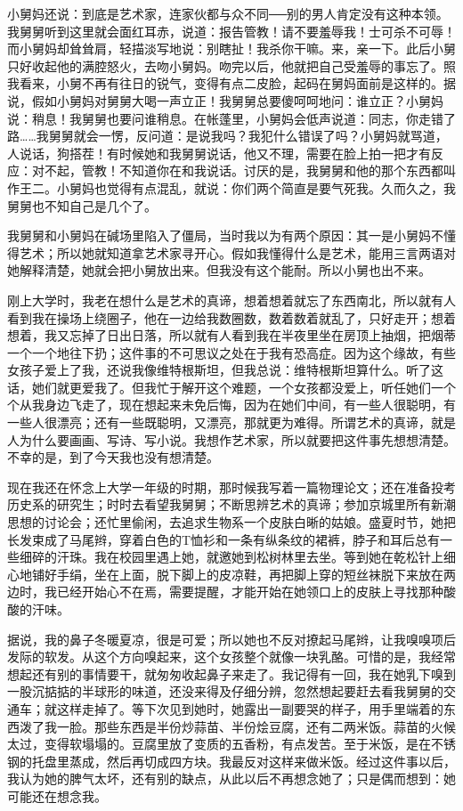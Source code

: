 小舅妈还说：到底是艺术家，连家伙都与众不同──别的男人肯定没有这种本领。我舅舅听到这里就会面红耳赤，说道：报告管教！请不要羞辱我！士可杀不可辱！而小舅妈却耸耸肩，轻描淡写地说：别瞎扯！我杀你干嘛。来，亲一下。此后小舅只好收起他的满腔怒火，去吻小舅妈。吻完以后，他就把自己受羞辱的事忘了。照我看来，小舅不再有往日的锐气，变得有点二皮脸，起码在舅妈面前是这样的。据说，假如小舅妈对舅舅大喝一声立正！我舅舅总要傻呵呵地问：谁立正？小舅妈说：稍息！我舅舅也要问谁稍息。在帐蓬里，小舅妈会低声说道：同志，你走错了路……我舅舅就会一愣，反问道：是说我吗？我犯什么错误了吗？小舅妈就骂道，人说话，狗搭茬！有时候她和我舅舅说话，他又不理，需要在脸上拍一把才有反应：对不起，管教！不知道你在和我说话。讨厌的是，我舅舅和他的那个东西都叫作王二。小舅妈也觉得有点混乱，就说：你们两个简直是要气死我。久而久之，我舅舅也不知自己是几个了。 

我舅舅和小舅妈在碱场里陷入了僵局，当时我以为有两个原因：其一是小舅妈不懂得艺术；所以她就知道拿艺术家寻开心。假如我懂得什么是艺术，能用三言两语对她解释清楚，她就会把小舅放出来。但我没有这个能耐。所以小舅也出不来。 

刚上大学时，我老在想什么是艺术的真谛，想着想着就忘了东西南北，所以就有人看到我在操场上绕圈子，他在一边给我数圈数，数着数着就乱了，只好走开；想着想着，我又忘掉了日出日落，所以就有人看到我在半夜里坐在房顶上抽烟，把烟蒂一个一个地往下扔；这件事的不可思议之处在于我有恐高症。因为这个缘故，有些女孩子爱上了我，还说我像维特根斯坦，但我总说：维特根斯坦算什么。听了这话，她们就更爱我了。但我忙于解开这个难题，一个女孩都没爱上，听任她们一个个从我身边飞走了，现在想起来未免后悔，因为在她们中间，有一些人很聪明，有一些人很漂亮；还有一些既聪明，又漂亮，那就更为难得。所谓艺术的真谛，就是人为什么要画画、写诗、写小说。我想作艺术家，所以就要把这件事先想想清楚。不幸的是，到了今天我也没有想清楚。 

现在我还在怀念上大学一年级的时期，那时候我写着一篇物理论文；还在准备投考历史系的研究生；时时去看望我舅舅；不断思辨艺术的真谛；参加京城里所有新潮思想的讨论会；还忙里偷闲，去追求生物系一个皮肤白晰的姑娘。盛夏时节，她把长发束成了马尾辫，穿着白色的T恤衫和一条有纵条纹的裙裤，脖子和耳后总有一些细碎的汗珠。我在校园里遇上她，就邀她到松树林里去坐。等到她在乾松针上细心地铺好手绢，坐在上面，脱下脚上的皮凉鞋，再把脚上穿的短丝袜脱下来放在两边时，我已经开始心不在焉，需要提醒，才能开始在她领口上的皮肤上寻找那种酸酸的汗味。 

据说，我的鼻子冬暖夏凉，很是可爱；所以她也不反对撩起马尾辫，让我嗅嗅项后发际的软发。从这个方向嗅起来，这个女孩整个就像一块乳酪。可惜的是，我经常想起还有别的事情要干，就匆匆收起鼻子来走了。我记得有一回，我在她乳下嗅到一股沉掂掂的半球形的味道，还没来得及仔细分辨，忽然想起要赶去看我舅舅的交通车；就这样走掉了。等下次见到她时，她露出一副要哭的样子，用手里端着的东西泼了我一脸。那些东西是半份炒蒜苗、半份烩豆腐，还有二两米饭。蒜苗的火候太过，变得软塌塌的。豆腐里放了变质的五香粉，有点发苦。至于米饭，是在不锈钢的托盘里蒸成，然后再切成四方块。我最反对这样来做米饭。经过这件事以后，我认为她的脾气太坏，还有别的缺点，从此以后不再想念她了；只是偶而想到：她可能还在想念我。 

